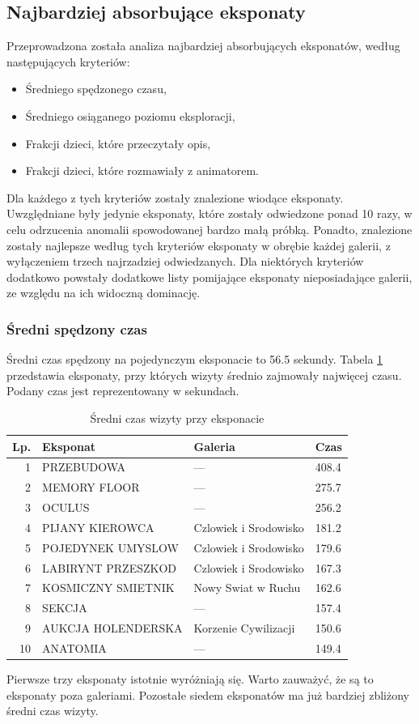 \documentclass[conference]{IEEEtran}
\begin{document}
\subsection{Najbardziej absorbujące eksponaty}
Przeprowadzona została analiza najbardziej absorbujących eksponatów, według następujących kryteriów:
\begin{itemize}
\item Średniego spędzonego czasu,
\item Średniego osiąganego poziomu eksploracji,
\item Frakcji dzieci, które przeczytały opis,
\item Frakcji dzieci, które rozmawiały z animatorem.
\end{itemize}
Dla każdego z tych kryteriów zostały znalezione wiodące eksponaty. Uwzględniane były jedynie eksponaty, które zostały odwiedzone ponad 10 razy, w celu odrzucenia anomalii spowodowanej bardzo małą próbką. Ponadto, znalezione zostały najlepsze według tych kryteriów eksponaty w obrębie każdej galerii, z wyłączeniem trzech najrzadziej odwiedzanych. Dla niektórych kryteriów dodatkowo powstały dodatkowe listy pomijające eksponaty nieposiadające galerii, ze względu na ich widoczną dominację.
\subsubsection{Średni spędzony czas}
Średni czas spędzony na pojedynczym eksponacie to 56.5 sekundy. Tabela \ref{top_czas} przedstawia eksponaty, przy których wizyty średnio zajmowały najwięcej czasu. Podany czas jest reprezentowany w sekundach.

\begin{table}[H]
\caption{Średni czas wizyty przy eksponacie}
\label{top_czas}
\centering
\begin{tabular}{|r|l|l|l|}
\hline
\textbf{Lp.} & \textbf{Eksponat} & \textbf{Galeria} & \textbf{Czas} \\
\hline
1  &         PRZEBUDOWA &                --- &  408.4    \\
2  &       MEMORY FLOOR &                --- &  275.7    \\
3  &             OCULUS &                --- &  256.2    \\
4  &    PIJANY KIEROWCA & Czlowiek i Srodowisko &  181.2    \\
5  &  POJEDYNEK UMYSLOW & Czlowiek i Srodowisko &  179.6    \\
6  & LABIRYNT PRZESZKOD & Czlowiek i Srodowisko &  167.3    \\
7  & KOSMICZNY SMIETNIK &    Nowy Swiat w Ruchu &  162.6    \\
8  &             SEKCJA &                --- &  157.4    \\
9  & AUKCJA HOLENDERSKA &  Korzenie Cywilizacji &  150.6    \\
10 &           ANATOMIA &                --- &  149.4    \\
\hline
\end{tabular}
\end{table}
Pierwsze trzy eksponaty istotnie wyróżniają się. Warto zauważyć, że są to eksponaty poza galeriami. Pozostałe siedem eksponatów ma już bardziej zbliżony średni czas wizyty.
\end{document}
